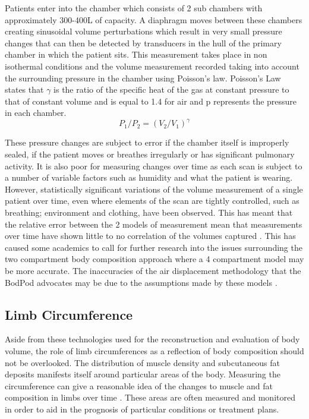 Patients enter into the chamber which consists of 2 sub chambers with approximately 300-400L of capacity. A diaphragm moves between these chambers creating sinusoidal volume perturbations which result in very small pressure changes that can then be detected by transducers in the hull of the primary chamber in which the patient sits. This measurement takes place in non isothermal conditions and the volume measurement recorded taking into account the surrounding pressure in the chamber using Poisson's law. Poisson's Law states that $\gamma$ is the ratio of the specific heat of the gas at constant pressure to that of constant volume and is equal to 1.4 for air and p represents the pressure in each chamber. \\

\begin{equation}
    \label{eq:poissonlaw}
    P_1/P_2 = (V_2/V_1)^\gamma
\end{equation} 

These pressure changes are subject to error if the chamber itself is improperly sealed, if the patient moves or breathes irregularly or has significant pulmonary activity. It is also poor for measuring changes over time as each scan is subject to a number of variable factors such as humidity and what the patient is wearing.\\

However, statistically significant variations of the volume measurement of a single patient over time, even where elements of the scan are tightly controlled, such as breathing; environment and clothing, have been observed. This has meant that the relative error between the 2 models of measurement mean that measurements over time have shown little to no correlation of the volumes captured \cite{Mahon2007}. This has caused some academics to call for further research into the issues surrounding the two compartment body composition approach where a 4 compartment model may be more accurate. The inaccuracies of the air displacement  methodology that the BodPod advocates may be due to the assumptions made by these models \cite{Lifemeasurement1997}. \\

\subsection{Limb Circumference}

Aside from these technologies used for the reconstruction and evaluation of body volume, the role of limb circumferences as a reflection of body composition should not be overlooked. The distribution of muscle density and subcutaneous fat deposits manifests itself around particular areas of the body. Measuring the circumference can give a reasonable idea of the changes to muscle and fat composition in limbs over time \cite{Frisancho1981}. These areas are often measured and monitored in order to aid in the prognosis of particular conditions or treatment plans. \\

